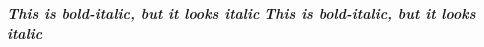 \documentclass{article}
\begin{document}
\textit{\textbf{This is bold-italic, but it looks italic}}
\textbf{\textit{This is bold-italic, but it looks italic}}
\end{document}
